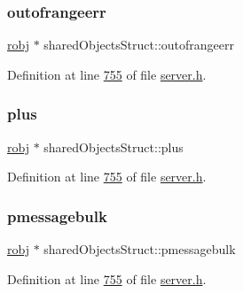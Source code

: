\mbox{\label{structsharedObjectsStruct_adebaaa7c51664b5d7a71e3243bcd5917}} 
\subsubsection{\texorpdfstring{outofrangeerr}{outofrangeerr}}
{\footnotesize\ttfamily \hyperlink{structredisObject}{robj} $\ast$ shared\+Objects\+Struct\+::outofrangeerr}



Definition at line \hyperlink{server_8h_source_l00755}{755} of file \hyperlink{server_8h_source}{server.\+h}.

\mbox{\label{structsharedObjectsStruct_ace4f60ac301dc8603ca484ad0c5be303}} 
\subsubsection{\texorpdfstring{plus}{plus}}
{\footnotesize\ttfamily \hyperlink{structredisObject}{robj} $\ast$ shared\+Objects\+Struct\+::plus}



Definition at line \hyperlink{server_8h_source_l00755}{755} of file \hyperlink{server_8h_source}{server.\+h}.

\mbox{\label{structsharedObjectsStruct_a2380ff1f1eda9ae8a48e7d16479163c4}} 
\subsubsection{\texorpdfstring{pmessagebulk}{pmessagebulk}}
{\footnotesize\ttfamily \hyperlink{structredisObject}{robj} $\ast$ shared\+Objects\+Struct\+::pmessagebulk}



Definition at line \hyperlink{server_8h_source_l00755}{755} of file \hyperlink{server_8h_source}{server.\+h}.

